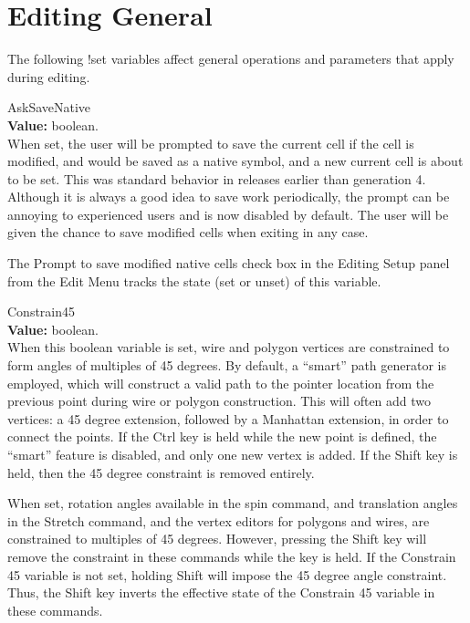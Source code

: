 \section{Editing General}

The following {\cb !set} variables affect general operations and
parameters that apply during editing.

\begin{description}
\item{\et AskSaveNative}\\
{\bf Value:} boolean.\\
When set, the user will be prompted to save the current cell if the
cell is modified, and would be saved as a native symbol, and a new
current cell is about to be set.  This was standard behavior in
releases earlier than generation 4.  Although it is always a good idea
to save work periodically, the prompt can be annoying to experienced
users and is now disabled by default.  The user will be given the
chance to save modified cells when exiting {\Xic} in any case.

The {\cb Prompt to save modified native cells} check box in the {\cb
Editing Setup} panel from the {\cb Edit Menu} tracks the state (set or
unset) of this variable.

\item{\et Constrain45}\\
{\bf Value:} boolean.\\
When this boolean variable is set, wire and polygon vertices are
constrained to form angles of multiples of 45 degrees.  By default, a
``smart'' path generator is employed, which will construct a valid
path to the pointer location from the previous point during wire or
polygon construction.  This will often add two vertices:  a 45 degree
extension, followed by a Manhattan extension, in order to connect the
points.  If the {\kb Ctrl} key is held while the new point is defined,
the ``smart'' feature is disabled, and only one new vertex is added. 
If the {\kb Shift} key is held, then the 45 degree constraint is
removed entirely.

When set, rotation angles available in the {\cb spin} command, and
translation angles in the {\cb Stretch} command, and the vertex
editors for polygons and wires, are constrained to multiples of 45
degrees.  However, pressing the {\kb Shift} key will remove the
constraint in these commands while the key is held.  If the {\et
Constrain 45} variable is not set, holding {\kb Shift} will impose the
45 degree angle constraint.  Thus, the {\kb Shift} key inverts the
effective state of the {\et Constrain 45} variable in these commands.


\end{description}
